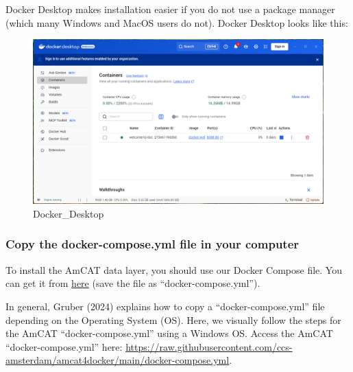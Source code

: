 \documentclass[
  letterpaper,
  DIV=11,
  numbers=noendperiod]{scrreprt}
\begin{document}
Docker Desktop makes installation easier if you do not use a package
manager (which many Windows and MacOS users do not). Docker Desktop
looks like this:

\begin{figure}[H]

{\centering \includegraphics[width=6.25in,height=\textheight]{media/amcat-2.1.2_1.png}

}

\caption{Docker\_Desktop}

\end{figure}%

\subsubsection{Copy the docker-compose.yml file in your
computer}\label{copy-the-docker-compose.yml-file-in-your-computer}

To install the AmCAT data layer, you should use our Docker Compose file.
You can get it from
\href{https://raw.githubusercontent.com/ccs-amsterdam/amcat4docker/main/docker-compose.yml}{here}
(save the file as ``docker-compose.yml'').

In general, Gruber (2024) explains how to copy a ``docker-compose.yml''
file depending on the Operating System (OS). Here, we visually follow
the steps for the AmCAT ``docker-compose.yml'' using a Windows OS.
Access the AmCAT ``docker-compose.yml'' here:
\url{https://raw.githubusercontent.com/ccs-amsterdam/amcat4docker/main/docker-compose.yml}.
\end{document}
